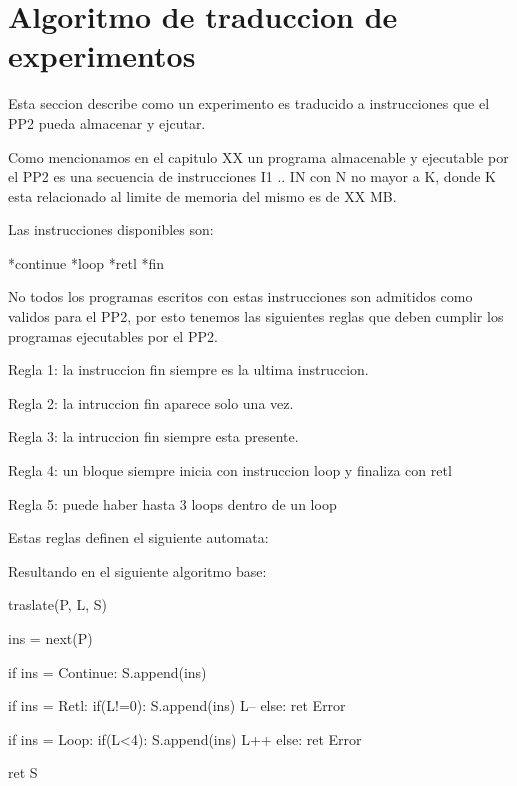 \section{Algoritmo de traduccion de experimentos}

Esta seccion describe como un experimento es traducido a instrucciones que el PP2 pueda almacenar y ejcutar.

Como mencionamos en el capitulo XX un programa almacenable y ejecutable por el PP2 es una secuencia de 
instrucciones I1 .. IN con N no mayor a K, donde K esta relacionado al limite de memoria del mismo es de XX MB.

Las instrucciones disponibles son:

*continue
*loop
*retl
*fin

No todos los programas escritos con estas instrucciones son admitidos como validos para el PP2, 
por esto tenemos las siguientes reglas que deben cumplir los programas ejecutables por el PP2.

Regla 1:
la instruccion fin siempre es la ultima instruccion.

Regla 2:
la intruccion fin aparece solo una vez.

Regla 3:
la intruccion fin siempre esta presente.

Regla 4:
un bloque siempre inicia con instruccion loop y finaliza con retl

Regla 5:
puede haber hasta 3 loops dentro de un loop

Estas reglas definen el siguiente automata:



Resultando en el siguiente algoritmo base: 


traslate(P, L, S)

    ins = next(P)

    if ins = Continue:
        S.append(ins)

    if ins = Retl:
        if(L!=0):
            S.append(ins)
            L--
        else:
            ret Error

    if ins = Loop:
        if(L<4):
            S.append(ins)
            L++
        else:
            ret Error
    
    ret S

\newpage